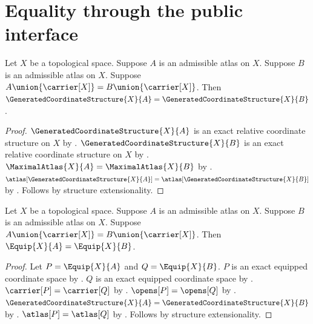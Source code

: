 \section{Equality through the public interface}

\begin{theorem}\label{generated_coordinate_structure_equal}
    Let $X$ be a topological space.
    Suppose $A$ is an admissible atlas on $X$.
    Suppose $B$ is an admissible atlas on $X$.
    Suppose $A\union\{\carrier[X]\}=B\union\{\carrier[X]\}$.
    Then $\GeneratedCoordinateStructure{X}{A}=\GeneratedCoordinateStructure{X}{B}$.
\end{theorem}
\begin{proof}
    $\GeneratedCoordinateStructure{X}{A}$ is an exact relative coordinate structure on $X$
        by .
    $\GeneratedCoordinateStructure{X}{B}$ is an exact relative coordinate structure on $X$
        by .
    $\MaximalAtlas{X}{A}=\MaximalAtlas{X}{B}$ by .
    $\atlas[\GeneratedCoordinateStructure{X}{A}]=\atlas[\GeneratedCoordinateStructure{X}{B}]$
        by .
    Follows by structure extensionality.
\end{proof}

\begin{theorem}\label{equip_equal}
    Let $X$ be a topological space.
    Suppose $A$ is an admissible atlas on $X$.
    Suppose $B$ is an admissible atlas on $X$.
    Suppose $A\union\{\carrier[X]\}=B\union\{\carrier[X]\}$.
    Then $\Equip{X}{A}=\Equip{X}{B}$.
\end{theorem}
\begin{proof}
    Let $P=\Equip{X}{A}$ and $Q=\Equip{X}{B}$.
    $P$ is an exact equipped coordinate space by .
    $Q$ is an exact equipped coordinate space by .
    $\carrier[P]=\carrier[Q]$ by .
    $\opens[P]=\opens[Q]$ by .
    $\GeneratedCoordinateStructure{X}{A}=\GeneratedCoordinateStructure{X}{B}$
        by .
    $\atlas[P]=\atlas[Q]$ by .
    Follows by structure extensionality.
\end{proof}
